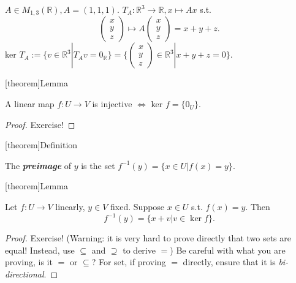 \documentclass[12pt]{report}
\theoremstyle{definition}
\begin{document}
\begin{ex}
    $A \in M_{1,3}(\mathbb{R}), A = (1, 1, 1)$.
    $T_A:\mathbb{R}^{3} \rightarrow{} \mathbb{R}, x \mapsto Ax$
    s.t.\[
        \begin{pmatrix}
                x \\
                y \\
                z
        \end{pmatrix} \mapsto A \begin{pmatrix}
                x \\
                y \\
                z
        \end{pmatrix} = x + y + z.
    \]
    ker $T_A := \{v \in \mathbb{R}^{3} | T_A v = 0_\mathbb{R}\} =
        \{\begin{pmatrix}
                x \\
                y \\
                z
        \end{pmatrix} \in \mathbb{R}^{3} | x + y + z = 0\}$.
\end{ex}

[theorem]{Lemma}
\begin{injective linear map iff ker = 0V}
    A linear map $f:U\rightarrow{}V$ is injective $\iff$ ker $f = \{0_U\}$.
\end{injective linear map iff ker = 0V}

\begin{proof}
    Exercise!
\end{proof}

[theorem]{Definition}
\begin{preimage}
    The \textbf{\emph{preimage}} of $y$ is the set
    $f^{-1}(y) = \{x\in U | f(x) = y\}$.
\end{preimage}

[theorem]{Lemma}
\begin{preimage = x + elements of kernel}
    Let $f:U\rightarrow{} V$ linearly, $y \in V$ fixed.
    Suppose $x \in U$ s.t. $f(x) = y$. Then\[
        f^{-1}(y) = \{x + v | v \in \ker{f}\}.
    \]
\end{preimage = x + elements of kernel}

\begin{proof}
    Exercise! (Warning: it is very hard to prove directly that two sets are equal!
    Instead, use $\subseteq$ and $\supseteq$ to derive $=$)
    Be careful with what you are proving, is it $=$ or $\subseteq$?
    For set, if proving $=$ directly, ensure that it is \emph{bi-directional}.
\end{proof}
\end{document}
